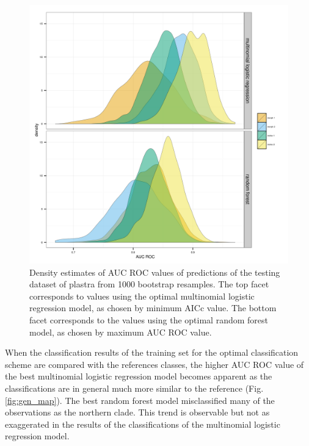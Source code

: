 \documentclass[12pt,letterpaper]{article}\usepackage{graphicx, color}
\begin{document}
\begin{figure}[ht]
  \centering
  \includegraphics[width = \textwidth]{figure/gen_res}
  \caption{Density estimates of AUC ROC values of predictions of the testing dataset of plastra from 1000 bootstrap resamples. The top facet corresponds to values using the optimal multinomial logistic regression model, as chosen by minimum AICc value. The bottom facet corresponds to the values using the optimal random forest model, as chosen by maximum AUC ROC value.}
  \label{fig:gen_res}
\end{figure}

When the classification results of the training set for the optimal classification scheme are compared with the references classes, the higher AUC ROC value of the best multinomial logistic regression model becomes apparent as the classifications are in general much more similar to the reference (Fig. \ref{fig:gen_map}). The best random forest model misclassified many of the observations as the northern clade. This trend is observable but not as exaggerated in the results of the classifications of the multinomial logistic regression model.
\end{document}
